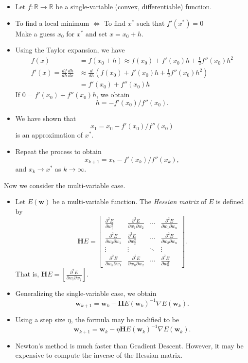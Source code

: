 \documentclass[
]{article}
\begin{document}
\begin{itemize}
\item
  Let \(f: \mathbb R \longrightarrow \mathbb R\) be a single-variable
  (convex, differentiable) function.
\item
  To find a local minimum \(\Longleftrightarrow\) \qquad To find \(x^*\)
  such that \(f'(x^*)=0\)\\
  Make a guess \(x_0\) for \(x^*\) and set \(x=x_0+h\).
\item
  Using the Taylor expansion, we have
  \begin{align*} f(x) &=f(x_0+h) \approx f(x_0) + f'(x_0) h+ \tfrac 1 2 f''(x_0) h^2 \\ f'(x) = \frac{df}{dh}\frac {dh}{dx} & \approx \frac d {dh} \left ( f(x_0) + f'(x_0) h+ \tfrac 1 2 f''(x_0) h^2 \right ) \\
  &= f'(x_0) + f''(x_0)h \end{align*} If \(0 = f'(x_0) + f''(x_0)h\), we
  obtain \[ h = - f'(x_0)/f''(x_0). \]
\item
  We have shown that \[ x_1=x_0- f'(x_0)/f''(x_0) \] is an approximation
  of \(x^*\).
\item
  Repeat the process to obtain
  \[ \boxed{x_{k+1}=x_k- f'(x_k)/f''(x_k)},  \] and
  \(x_k \rightarrow x^*\) as \(k \rightarrow \infty\).
\end{itemize}

Now we consider the multi-variable case.

\begin{itemize}
\item
  Let \(E({\boldsymbol{w}})\) be a multi-variable function. The
  \emph{Hessian matrix} of \(E\) is defined by
  \[ \mathbf H E= \begin{bmatrix} \tfrac {\partial^2 E}{\partial w_1^2} &  \tfrac {\partial^2 E}{\partial w_1 \partial w_2} & \cdots &  \tfrac {\partial^2 E}{\partial w_1 \partial w_n} \\ \tfrac {\partial^2 E}{\partial w_2 \partial w_1} & \tfrac {\partial^2 E}{\partial w_2^2} & \cdots & \tfrac {\partial^2 E}{\partial w_2 \partial w_n} \\ \vdots & \vdots & \ddots & \vdots \\ \tfrac {\partial^2 E}{\partial w_n \partial w_1} & \tfrac {\partial^2 E}{\partial w_n \partial w_2} & \cdots & \tfrac {\partial^2 E}{\partial w_n^2}  \end{bmatrix}. \]
  That is,
  \(\mathbf H E= [ \tfrac {\partial^2 E}{\partial w_i \partial w_j}]\).
\item
  Generalizing the single-variable case, we obtain\\
  \[ \boxed{ {\boldsymbol{w}}_{k+1}= {\boldsymbol{w}}_k - \mathbf H E ({\boldsymbol{w}}_{k})^{-1} \nabla E({\boldsymbol{w}}_k)} . \]
\item
  Using a step size \(\eta\), the formula may be modified to be
  \[  \boxed{ {\boldsymbol{w}}_{k+1}= {\boldsymbol{w}}_k - \eta \mathbf H E ({\boldsymbol{w}}_{k})^{-1} \nabla E({\boldsymbol{w}}_k)} . \]
\item
  Newton's method is much faster than Gradient Descent. However, it may
  be expensive to compute the inverse of the Hessian matrix.
\end{itemize}
\end{document}
